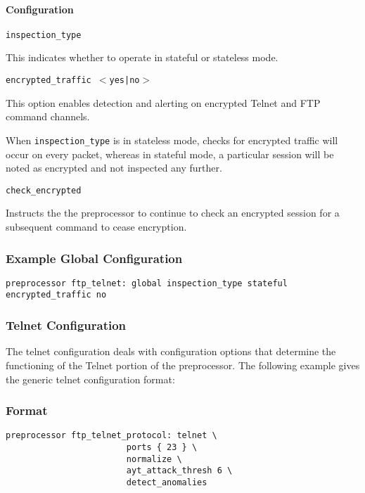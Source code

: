 \documentclass[english]{report}
\newcounter{slistnum}
\newenvironment{slist}
{ \begin{list}{ {\bf \arabic{slistnum}.} }{\usecounter{slistnum} } }
{ \end{list} }
\newenvironment{note}{
\samepage
    \vspace{10pt}{\textsf{
        {\hspace{7pt}\Huge{$\triangle$\hspace{-12.5pt}{\Large{$^!$}}}}\hspace{5pt}
        {\Large{NOTE}}
    }
    }
   \begin{center}
    \par\vspace{-17pt}

    \begin{lrbox}{\savepar}
    \begin{minipage}[r]{6in}
}
{
    \end{minipage}
    \end{lrbox}
    \fbox{
        \usebox{
            \savepar
	}
    }
    \par\vskip10pt
    \end{center}
}
\newenvironment{note}{
        \begin{rawhtml}
        <p><table border="1"><tr><td><b>
        Note:&nbsp;&nbsp;</b>
        \end{rawhtml}
}{
        \begin{rawhtml}
        </b></td></tr></table></p>
        \end{rawhtml}
}
\begin{document}
\paragraph{Configuration}
\begin{slist}
\item \texttt{inspection\_type}

This indicates whether to operate in stateful or stateless mode.

\item \texttt{encrypted\_traffic $<$yes|no$>$}

This option enables detection and alerting on encrypted Telnet and
FTP command channels.

\begin{note}
When \texttt{inspection\_type} is in stateless mode, checks for encrypted
traffic will occur on every packet, whereas in stateful mode, a particular
session will be noted as encrypted and not inspected any further.
\end{note}

\item \texttt{check\_encrypted}

Instructs the the preprocessor to continue to check an encrypted session
for a subsequent command to cease encryption.

\end{slist}

\subsubsection{Example Global Configuration}

\begin{verbatim}
preprocessor ftp_telnet: global inspection_type stateful encrypted_traffic no
\end{verbatim}

\subsubsection{Telnet Configuration}

The telnet configuration deals with configuration options that determine the
functioning of the Telnet portion of the preprocessor.  The following
example gives the generic telnet configuration format:

\subsubsection{Format}
\begin{verbatim}
preprocessor ftp_telnet_protocol: telnet \
                        ports { 23 } \
                        normalize \
                        ayt_attack_thresh 6 \
                        detect_anomalies

\end{verbatim}
\end{document}
